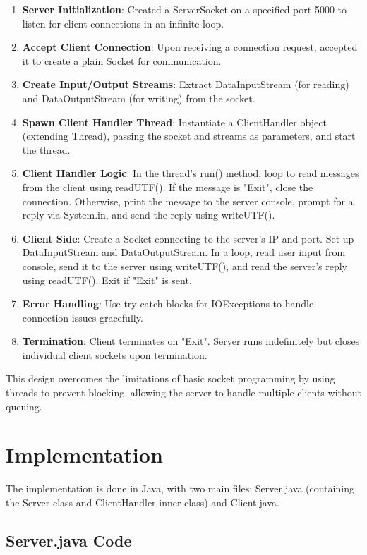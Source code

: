 \documentclass{article}
\begin{document}
\begin{enumerate}
    \item \textbf{Server Initialization}: Created a ServerSocket on a specified port 5000 to listen for client connections in an infinite loop.
    \item \textbf{Accept Client Connection}: Upon receiving a connection request, accepted it to create a plain Socket for communication.
    \item \textbf{Create Input/Output Streams}: Extract DataInputStream (for reading) and DataOutputStream (for writing) from the socket.
    \item \textbf{Spawn Client Handler Thread}: Instantiate a ClientHandler object (extending Thread), passing the socket and streams as parameters, and start the thread.
    \item \textbf{Client Handler Logic}: In the thread's run() method, loop to read messages from the client using readUTF(). If the message is "Exit", close the connection. Otherwise, print the message to the server console, prompt for a reply via System.in, and send the reply using writeUTF().
    \item \textbf{Client Side}: Create a Socket connecting to the server's IP and port. Set up DataInputStream and DataOutputStream. In a loop, read user input from console, send it to the server using writeUTF(), and read the server's reply using readUTF(). Exit if "Exit" is sent.
    \item \textbf{Error Handling}: Use try-catch blocks for IOExceptions to handle connection issues gracefully.
    \item \textbf{Termination}: Client terminates on "Exit". Server runs indefinitely but closes individual client sockets upon termination.
\end{enumerate}

This design overcomes the limitations of basic socket programming by using threads to prevent blocking, allowing the server to handle multiple clients without queuing.

\section{Implementation}

The implementation is done in Java, with two main files: Server.java (containing the Server class and ClientHandler inner class) and Client.java.

\subsection{Server.java Code}
\end{document}
